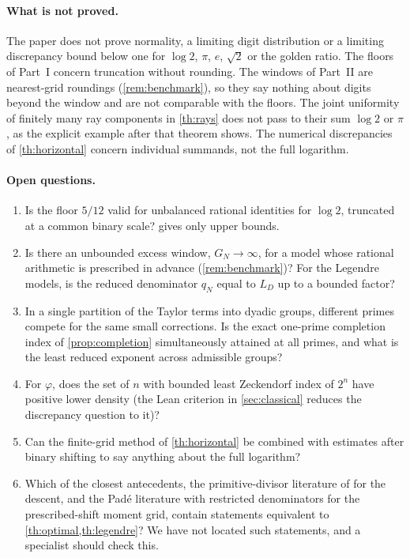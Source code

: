 \documentclass[11pt]{article}
\begin{document}
\paragraph{What is not proved.} The paper does not prove normality, a limiting digit distribution or a limiting discrepancy bound below one for $\log 2$, $\pi$, $e$, $\sqrt2$ or the golden ratio. The floors of Part~I concern truncation without rounding. The windows of Part~II are nearest-grid roundings (\cref{rem:benchmark}), so they say nothing about digits beyond the window and are not comparable with the floors. The joint uniformity of finitely many ray components in \cref{th:rays} does not pass to their sum $\log 2$ or $\pi$, as the explicit example after that theorem shows. The numerical discrepancies of \cref{th:horizontal} concern individual summands, not the full logarithm.

\paragraph{Open questions.}
\begin{enumerate}[label=(\arabic*),leftmargin=*]
\item Is the floor $5/12$ valid for unbalanced rational identities for $\log 2$, truncated at a common binary scale?  gives only upper bounds.
\item Is there an unbounded excess window, $G_N\to\infty$, for a model whose rational arithmetic is prescribed in advance (\cref{rem:benchmark})? For the Legendre models, is the reduced denominator $q_N$ equal to $L_D$ up to a bounded factor?
\item In a single partition of the Taylor terms into dyadic groups, different primes compete for the same small corrections. Is the exact one-prime completion index of \cref{prop:completion} simultaneously attained at all primes, and what is the least reduced exponent across admissible groups?
\item For $\varphi$, does the set of $n$ with bounded least Zeckendorf index of $2^n$ have positive lower density (the Lean criterion in \cref{sec:classical} reduces the discrepancy question to it)?
\item Can the finite-grid method of \cref{th:horizontal} be combined with estimates after binary shifting to say anything about the full logarithm?
\item Which of the closest antecedents, the primitive-divisor literature of \cite{bbg,storm,todd} for the descent, and the Pad\'e literature with restricted denominators \cite{rivoal} for the prescribed-shift moment grid, contain statements equivalent to \cref{th:optimal,th:legendre}? We have not located such statements, and a specialist should check this.
\end{enumerate}
\end{document}
